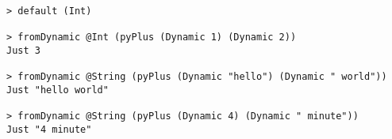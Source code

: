 \begin{repl}\begin{lstlisting}
> default (Int)

> fromDynamic @Int (pyPlus (Dynamic 1) (Dynamic 2))
Just 3

> fromDynamic @String (pyPlus (Dynamic "hello") (Dynamic " world"))
Just "hello world"

> fromDynamic @String (pyPlus (Dynamic 4) (Dynamic " minute"))
Just "4 minute"\end{lstlisting}\end{repl}
